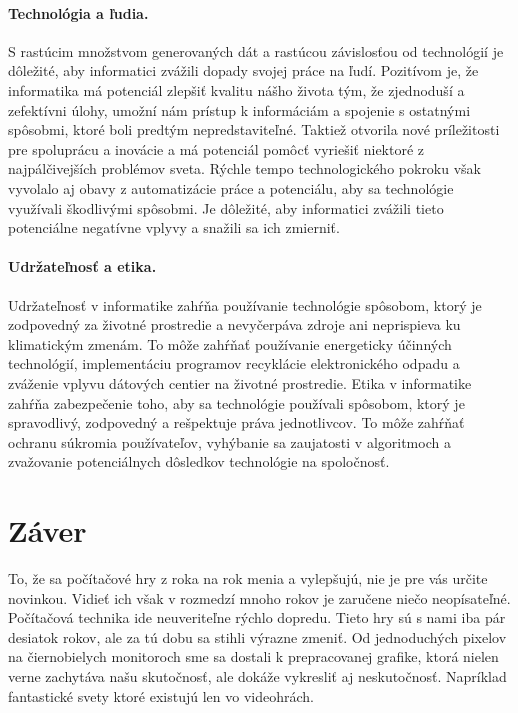 \documentclass[10pt,oneside,slovak,a4paper]{article}
\begin{document}
\paragraph{Technológia a ľudia.}

S rastúcim množstvom generovaných dát a rastúcou závislosťou od technológií je dôležité, aby informatici zvážili dopady svojej práce na ľudí.
Pozitívom je, že informatika má potenciál zlepšiť kvalitu nášho života tým, že zjednoduší a zefektívni úlohy, umožní nám prístup k informáciám a spojenie s ostatnými spôsobmi, ktoré boli predtým nepredstaviteľné. Taktiež otvorila nové príležitosti pre spoluprácu a inovácie a má potenciál pomôcť vyriešiť niektoré z najpálčivejších problémov sveta.
Rýchle tempo technologického pokroku však vyvolalo aj obavy z automatizácie práce a potenciálu, aby sa technológie využívali škodlivými spôsobmi. Je dôležité, aby informatici zvážili tieto potenciálne negatívne vplyvy a snažili sa ich zmierniť.

\paragraph{Udržateľnosť a etika.}

Udržateľnosť v informatike zahŕňa používanie technológie spôsobom, ktorý je zodpovedný za životné prostredie a nevyčerpáva zdroje ani neprispieva ku klimatickým zmenám. To môže zahŕňať používanie energeticky účinných technológií, implementáciu programov recyklácie elektronického odpadu a zváženie vplyvu dátových centier na životné prostredie.
Etika v informatike zahŕňa zabezpečenie toho, aby sa technológie používali spôsobom, ktorý je spravodlivý, zodpovedný a rešpektuje práva jednotlivcov. To môže zahŕňať ochranu súkromia používateľov, vyhýbanie sa zaujatosti v algoritmoch a zvažovanie potenciálnych dôsledkov technológie na spoločnosť.



\section{Záver} \label{zaver}

To, že sa počítačové hry z roka na rok menia a vylepšujú, nie je pre vás určite novinkou. Vidieť ich však v rozmedzí mnoho rokov je zaručene niečo neopísateľné. Počítačová technika ide neuveriteľne rýchlo dopredu. Tieto hry sú s nami iba pár desiatok rokov, ale za tú dobu sa stihli výrazne zmeniť. Od jednoduchých pixelov na čiernobielych monitoroch sme sa dostali k prepracovanej grafike, ktorá nielen verne zachytáva našu skutočnosť, ale dokáže vykresliť aj neskutočnosť. Napríklad fantastické svety ktoré existujú len vo videohrách.
\end{document}
